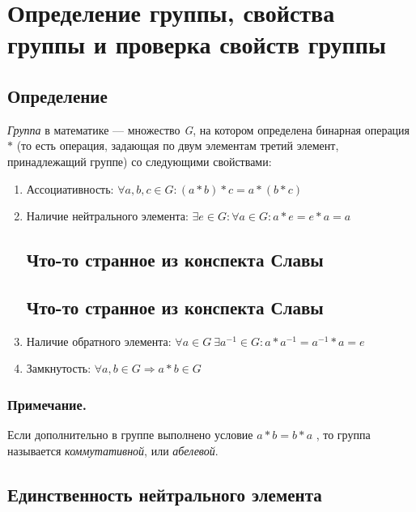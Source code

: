 \documentclass[12pt]{article}
\begin{document}
\section{Определение группы, свойства группы и проверка свойств группы}

\subsection{Определение}
\emph{Группа} в математике --- множество \emph{G}, на котором определена
бинарная операция $*$ (то есть операция, задающая по двум элементам третий
элемент, принадлежащий группе) со следующими свойствами:

\begin{enumerate}
    \item
          Ассоциативность: $\forall a, b, c \in G: (a * b) * c = a * (b * c)$

    \item
          Наличие нейтрального элемента: $\exists e \in G : \forall a \in G: a * e = e * a = a$
          \subsection{Что-то странное из конспекта Славы}
          \subsection{Что-то странное из конспекта Славы}

    \item
          Наличие обратного элемента: $\forall a \in G \ \exists a^{−1}\in G: a * a^{−1} = a^{−1} * a = e$

    \item
          Замкнутость: $\forall a, b \in G \Rightarrow a * b \in G$
\end{enumerate}

\subsubsection{Примечание.}

Если дополнительно в группе выполнено условие $a * b = b * a$ , то группа
называется \emph{коммутативной}, или \emph{абелевой}.

\subsection{Единственность нейтрального элемента}
\end{document}
